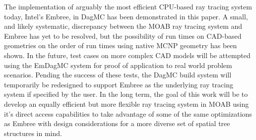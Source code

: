 \documentclass{anstrans}
\begin{document}
The implementation of arguably the most efficient CPU-based ray tracing system today, Intel's Embree, in DagMC has been demonstrated in this paper. A small, and likely systematic, discrepancy between the MOAB ray tracing system and Embree has yet to be resolved, but the possibility of run times on CAD-based geometries on the order of run times using native MCNP geometry has been shown.
In the future, test cases on more complex CAD models will be attempted using the EmDagMC system for proof of application to real world problem scenarios. Pending the success of these tests, the DagMC build system will temporarily be redesigned to support Embree as the underlying ray tracing system if specified by the user. In the long term, the goal of this work will be to develop an equally efficient but more flexible ray tracing system in MOAB using it's direct access capabilities \cite{moab} to take advantage of some of the same optimizations as Embree with design considerations for a more diverse set of spatial tree structures in mind. 



\end{document}
